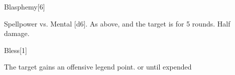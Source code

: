 \begin{spellsection}{Blasphemy}[6]
    \begin{spellheader}
    \end{spellheader}
    \begin{spellcontent}
        \begin{spelltargetinginfo}
        \end{spelltargetinginfo}
        \begin{spelleffects}
            \begin{spellattack}{Spellpower vs. Mental}
                \spellsuccess {}[d6].
                \spellcritical As above, and the target is \staggered for 5 rounds.
                \spellfailure Half damage.
            \end{spellattack}
        \end{spelleffects}
    \end{spellcontent}
    \begin{spellfooter}
        \miscastexplode
    \end{spellfooter}
\end{spellsection}

\begin{spellsection}{Bless}[1]
    \begin{spellheader}
    \end{spellheader}
    \begin{spellcontent}
        \begin{spelltargetinginfo}
        \end{spelltargetinginfo}
        \begin{spelleffects}
            \spelleffect The target gains an offensive legend point.
            \spelldur \durshort or until expended
        \end{spelleffects}
    \end{spellcontent}
    \begin{spellfooter}
        \miscastrandom
    \end{spellfooter}
\end{spellsection}

